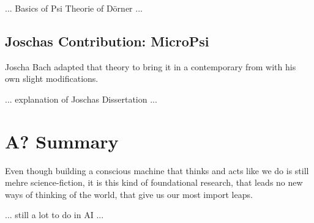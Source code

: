 ... Basics of Psi Theorie of Dörner ...

\subsection{Joschas Contribution: MicroPsi}
Joscha Bach adapted that theory to bring it in a contemporary from with his own slight modifications.

... explanation of Joschas Dissertation ...

\section{A? Summary}
Even though building a conscious machine that thinks and acts like we do is still mehre science-fiction, it is this kind of foundational research, that leads no new ways of thinking of the world, that give us our most import leaps.

... still a lot to do in AI ...
